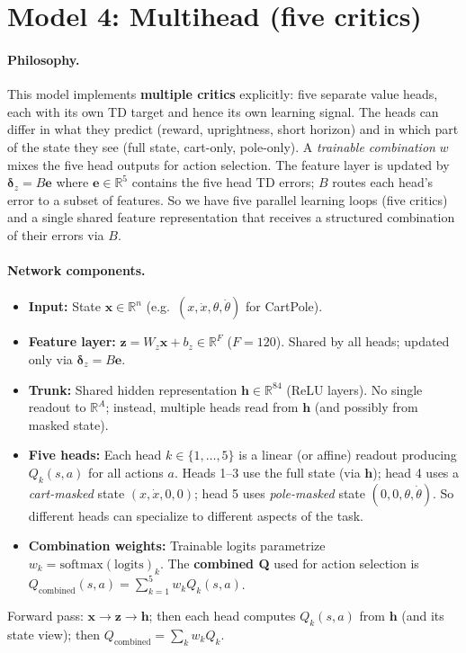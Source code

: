 \documentclass[11pt]{article}
\begin{document}
\section{Model 4: Multihead (five critics)}

\paragraph{Philosophy.} This model implements \textbf{multiple critics} explicitly: five separate value heads, each with its own TD target and hence its own learning signal. The heads can differ in what they predict (reward, uprightness, short horizon) and in which part of the state they see (full state, cart-only, pole-only). A \emph{trainable combination} $w$ mixes the five head outputs for action selection. The feature layer is updated by $\boldsymbol{\delta}_z = B\mathbf{e}$ where $\mathbf{e} \in \mathbb{R}^5$ contains the five head TD errors; $B$ routes each head's error to a subset of features. So we have five parallel learning loops (five critics) and a single shared feature representation that receives a structured combination of their errors via $B$.

\paragraph{Network components.}
\begin{itemize}
\item \textbf{Input:} State $\mathbf{x} \in \mathbb{R}^n$ (e.g.\ $(x, \dot{x}, \theta, \dot{\theta})$ for CartPole).
\item \textbf{Feature layer:} $\mathbf{z} = W_z \mathbf{x} + b_z \in \mathbb{R}^F$ ($F=120$). Shared by all heads; updated only via $\boldsymbol{\delta}_z = B\mathbf{e}$.
\item \textbf{Trunk:} Shared hidden representation $\mathbf{h} \in \mathbb{R}^{84}$ (ReLU layers). No single readout to $\mathbb{R}^A$; instead, multiple heads read from $\mathbf{h}$ (and possibly from masked state).
\item \textbf{Five heads:} Each head $k \in \{1,\ldots,5\}$ is a linear (or affine) readout producing $Q_k(s,a)$ for all actions $a$. Heads 1--3 use the full state (via $\mathbf{h}$); head 4 uses a \emph{cart-masked} state $(x, \dot{x}, 0, 0)$; head 5 uses \emph{pole-masked} state $(0, 0, \theta, \dot{\theta})$. So different heads can specialize to different aspects of the task.
\item \textbf{Combination weights:} Trainable logits parametrize $w_k = \mathrm{softmax}(\mathrm{logits})_k$. The \textbf{combined Q} used for action selection is $Q_{\text{combined}}(s,a) = \sum_{k=1}^{5} w_k Q_k(s,a)$.
\end{itemize}
Forward pass: $\mathbf{x} \to \mathbf{z} \to \mathbf{h}$; then each head computes $Q_k(s,a)$ from $\mathbf{h}$ (and its state view); then $Q_{\text{combined}} = \sum_k w_k Q_k$.
\end{document}
